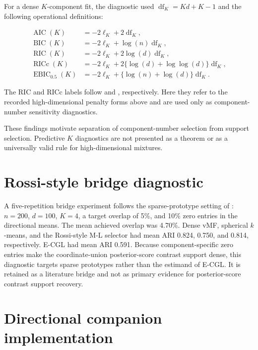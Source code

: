 \documentclass[preprint,12pt,authoryear]{elsarticle}
\begin{document}
For a dense $K$-component fit, the diagnostic used
$\operatorname{df}_K=Kd+K-1$ and the following operational definitions:

\[
\begin{aligned}
\operatorname{AIC}(K)&=-2\ell_K+2\operatorname{df}_K,\\
\operatorname{BIC}(K)&=-2\ell_K+\log(n)\operatorname{df}_K,\\
\operatorname{RIC}(K)&=-2\ell_K+2\log(d)\operatorname{df}_K,\\
\operatorname{RICc}(K)&=-2\ell_K+2\{\log(d)+\log\log(d)\}\operatorname{df}_K,\\
\operatorname{EBIC}_{0.5}(K)&=-2\ell_K+\{\log(n)+\log(d)\}\operatorname{df}_K.
\end{aligned}
\]

The RIC and RICc labels follow \citet{foster1994ric} and
\citet{zhang2010ricc}, respectively. Here they refer to the recorded
high-dimensional penalty forms above and are used only as component-number
sensitivity diagnostics.

These findings motivate separation of component-number selection from support
selection. Predictive $K$ diagnostics are not presented as a theorem or as a
universally valid rule for high-dimensional mixtures.

\section{Rossi-style bridge diagnostic}
\label{sec:s-rossi-bridge}

A five-repetition bridge experiment follows the sparse-prototype setting of
\citet{rossi2022sparsevmf}: $n=200$, $d=100$, $K=4$, a target overlap of 5\%, and
10\% zero entries in the directional means. The mean achieved overlap was
4.70\%. Dense vMF, spherical $k$-means, and the Rossi-style M-L selector had mean
ARI 0.824, 0.750, and 0.814, respectively. E-CGL had mean ARI 0.591. Because
component-specific zero entries make the coordinate-union posterior-score contrast support
dense, this diagnostic targets sparse prototypes rather than the estimand of
E-CGL. It is retained as a literature bridge and not as primary evidence for
posterior-score contrast support recovery.

\section{Directional companion implementation}
\label{sec:s-target-diagnostic}
\end{document}
